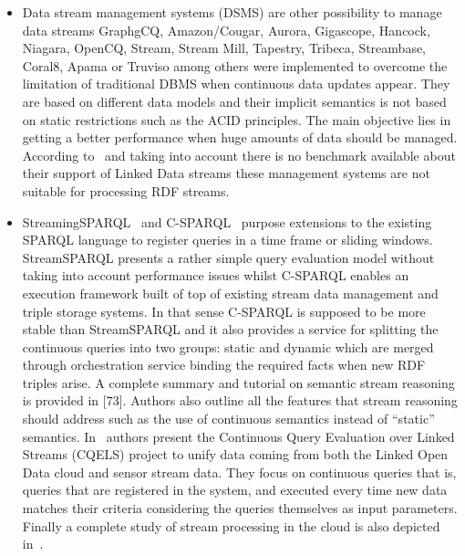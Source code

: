 \begin{itemize}
\item Data stream management systems (DSMS) are other possibility to manage data streams GraphgCQ, Amazon/Cougar, Aurora, Gigascope, 
Hancock, Niagara, OpenCQ, Stream, Stream Mill, Tapestry, Tribeca, Streambase, Coral8, Apama or Truviso among others were implemented to overcome the 
limitation of traditional DBMS when continuous data updates appear. They are based on different data models and their implicit semantics is not based on static 
restrictions such as the ACID principles. The main objective lies in getting a better performance when huge amounts of data should be managed. According to~\cite{deri2010} and 
taking into account there is no benchmark available about their support of Linked Data streams these management systems are not suitable for processing RDF streams. 


\item StreamingSPARQL~\cite{Bolles:2008:SSE:1789394.1789438} and 
C-SPARQL~\cite{Barbieri:2010:EEC:1739041.1739095} purpose extensions to the 
existing SPARQL language to register queries in a time frame or sliding windows. 
StreamSPARQL presents a rather simple query evaluation model without taking into 
account performance issues whilst C-SPARQL enables an execution framework built 
of top of existing stream data management and triple storage systems. In that 
sense C-SPARQL is supposed to be more stable than StreamSPARQL and it also 
provides a service for splitting the continuous queries into two groups: static 
and dynamic which are merged through orchestration service binding the required 
facts when new RDF triples arise. A complete summary and tutorial on semantic 
stream reasoning is provided in [73]. Authors also outline all the features that 
stream reasoning should address such as the use of continuous semantics instead 
of ``static'' semantics. In~\cite{deri2010} authors present the Continuous Query Evaluation 
over Linked Streams (CQELS) project to unify data coming from both the Linked 
Open Data cloud and sensor stream data. They focus on continuous queries that 
is, queries that are registered in the system, and executed every time new data 
matches their criteria considering the queries themselves as input parameters. 
Finally a complete study of stream processing in the cloud 
is also depicted in~\cite{Backman:2012:MPS:2169090.2169091}.


\end{itemize}
